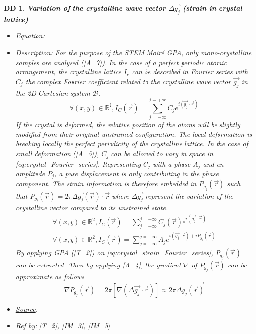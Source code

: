 \documentclass[12pt]{article}
\newtheorem{DD}{DD}
\begin{document}
\begin{DD}
\label{DD_1}
\noindent\colorbox{shadecolorDD}{\normalfont \textbf{Variation of the crystalline wave vector $\Delta \overrightarrow{g_j}$ (strain in crystal lattice)}}
\normalfont
\begin{itemize}
\item \underline{Equation}: 
\item \underline{Description}: For the purpose of the STEM Moir{\'e} GPA, only mono-crystalline samples are analysed (\cref{A_7}). In the case of a perfect periodic atomic arrangement, the crystalline lattice $I_c$ can be described in Fourier series with $C_j$ the complex Fourier coefficient related to the crystalline wave vector $\vec{g_j}$ in the 2D Cartesian system $\mathcal{B}$.
\begin{equation}
\forall (x,y) \in \mathbb{R}^{2},I_C(\vec{r})=\sum_{j=-\infty}^{j=+\infty}C_je^{i(\vec{g_j}\cdot\vec{r})}
\label{eq:crystal_Fourier_series}
\end{equation}
If the crystal is deformed, the relative position of the atoms will be slightly modified from their original unstrained configuration. The local deformation is breaking locally the perfect periodicity of the crystalline lattice. In the case of small deformation (\cref{A_5}), $C_j$ can be allowed to vary in space in \cref{eq:crystal_Fourier_series}. Representing $C_j$ with a phase $A_j$ and an amplitude $P_j$, a pure displacement is only contributing in the phase component. The strain information is therefore embedded in $P_{g_{j}}(\vec{r})$ such that $P_{g_{j}}(\vec{r})=2\pi\Delta \overrightarrow{g_{j}}(\vec{r})\cdot\vec{r}$ where $\Delta \overrightarrow{g_j}$ represent the variation of the crystalline vector compared to its unstrained state.
\begin{equation}
\begin{gathered}
\forall (x,y) \in \mathbb{R}^{2},I_C(\vec{r})=\sum_{j=-\infty}^{j=+\infty}C_j(\vec{r})e^{i(\vec{g_j}\cdot\vec{r})} \\
\forall (x,y) \in \mathbb{R}^{2},I_C(\vec{r})=\sum_{j=-\infty}^{j=+\infty}A_je^{i(\vec{g_j}\cdot\vec{r})+iP_{g_{j}}(\vec{r})}
\end{gathered}
\label{eq:crystal_strain_Fourier_series}
\end{equation}
By applying GPA (\cref{T_2}) on \cref{eq:crystal_strain_Fourier_series}, $P_{g_{j}}(\vec{r})$ can be extracted. Then by applying \cref{A_4}, the gradient $\nabla$ of $P_{g_{j}}(\vec{r})$ can be approximate as follows
\begin{equation}
\nabla P_{g_{j}}(\vec{r}) = 2\pi [\nabla( \Delta \overrightarrow{g_j}\cdot\vec{r}  )] \approx 2\pi\Delta \overrightarrow{g_j(\vec{r})}
\label{eq:Strain_GPA}
\end{equation}
\item \underline{Source}: \cite{Hytch1998}
\item \underline{Ref by}: \cref{T_2}, \cref{IM_3}, \cref{IM_5}
\end{itemize}
\end{DD}
\end{document}
